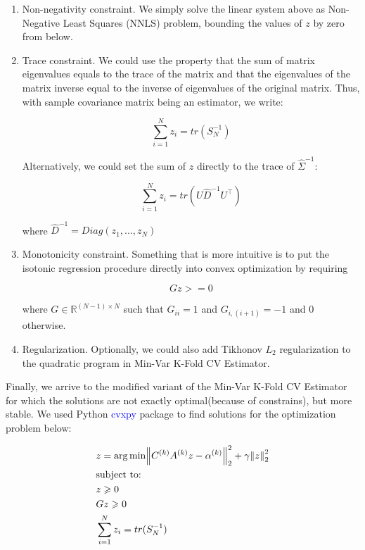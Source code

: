 \documentclass{article}
\begin{document}
\begin{enumerate}

\item Non-negativity constraint.
We simply solve the linear system above as Non-Negative Least Squares (NNLS) problem, bounding the values of $z$ by zero from below.

\item Trace constraint. 
We could use the property that the sum of matrix eigenvalues equals to the trace of the matrix and that the eigenvalues of the matrix inverse equal to the inverse of eigenvalues of the original matrix. Thus, with sample covariance matrix being an estimator, we write: 

$$ 
\sum_{i=1}^N z_i =tr(S_N^{-1})
$$

Alternatively, we could set the sum of $z$ directly to the trace of $\hat{\Sigma}^{-1}$: 

$$
\sum_{i=1}^N z_i =tr(U \hat{D}^{-1}U^\intercal)
$$

where $\hat{D}^{-1} = Diag(z_1,...,z_N)$
\item Monotonicity constraint. Something that is more intuitive is to put the isotonic regression procedure directly into convex optimization by requiring

$$
Gz >= 0
$$

where $G\in \mathbb{R}^{(N-1)\times N}$ such that $G_{ii} = 1$ and $G_{i,(i+1)} = -1$ and 0 otherwise.

\item Regularization. Optionally, we could also add Tikhonov $L_2$ regularization to the quadratic program in Min-Var K-Fold CV Estimator. 

\end{enumerate}

\noindent Finally, we arrive to the modified variant of the Min-Var K-Fold CV Estimator for which the solutions are not exactly optimal(because of constrains), but more stable. We used Python \textcolor{blue}{cvxpy} package to find solutions for the optimization problem below: 

\begin{equation*}
  \begin{aligned}
  & z = \arg\min \norm{C^{(k)}A^{(k)}z-\alpha^{(k)}}^2_2 + \gamma \norm{z}^2_2 \\
  & \text{subject to:} \\
  & z\geqslant0\\
  & Gz \geqslant 0\\
  & \sum_{i=1}^N z_i =tr(S_N^{-1})\\
  \end{aligned}
\end{equation*}
\end{document}
